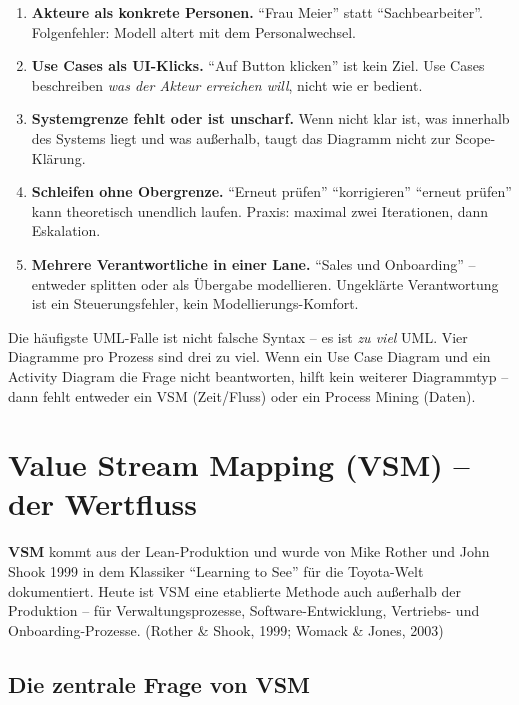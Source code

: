 \documentclass[11pt,a4paper,oneside]{article}
\newcommand{\fachbegriff}[1]{\textbf{#1}}
\newcommand{\quelle}[1]{{\footnotesize\color{lpGray}(#1)}}
\begin{document}
\begin{enumerate}
  \item \fachbegriff{Akteure als konkrete Personen.} ``Frau Meier'' statt ``Sachbearbeiter''. Folgenfehler: Modell altert mit dem Personalwechsel.
  \item \fachbegriff{Use Cases als UI-Klicks.} ``Auf Button klicken'' ist kein Ziel. Use Cases beschreiben \emph{was der Akteur erreichen will}, nicht wie er bedient.
  \item \fachbegriff{Systemgrenze fehlt oder ist unscharf.} Wenn nicht klar ist, was innerhalb des Systems liegt und was außerhalb, taugt das Diagramm nicht zur Scope-Klärung.
  \item \fachbegriff{Schleifen ohne Obergrenze.} ``Erneut prüfen'' \textrightarrow{} ``korrigieren'' \textrightarrow{} ``erneut prüfen'' kann theoretisch unendlich laufen. Praxis: maximal zwei Iterationen, dann Eskalation.
  \item \fachbegriff{Mehrere Verantwortliche in einer Lane.} ``Sales und Onboarding'' -- entweder splitten oder als Übergabe modellieren. Ungeklärte Verantwortung ist ein Steuerungsfehler, kein Modellierungs-Komfort.
\end{enumerate}

\begin{merkbox}
Die häufigste UML-Falle ist nicht falsche Syntax -- es ist \emph{zu viel} UML. Vier Diagramme pro Prozess sind drei zu viel. Wenn ein Use Case Diagram und ein Activity Diagram die Frage nicht beantworten, hilft kein weiterer Diagrammtyp -- dann fehlt entweder ein VSM (Zeit/Fluss) oder ein Process Mining (Daten).
\end{merkbox}

\section{Value Stream Mapping (VSM) -- der Wertfluss}

\fachbegriff{VSM} kommt aus der Lean-Produktion und wurde von Mike Rother und John Shook 1999 in dem Klassiker ``Learning to See'' für die Toyota-Welt dokumentiert. Heute ist VSM eine etablierte Methode auch außerhalb der Produktion -- für Verwaltungsprozesse, Software-Entwicklung, Vertriebs- und Onboarding-Prozesse. \quelle{Rother \& Shook, 1999; Womack \& Jones, 2003}

\subsection{Die zentrale Frage von VSM}
\end{document}
